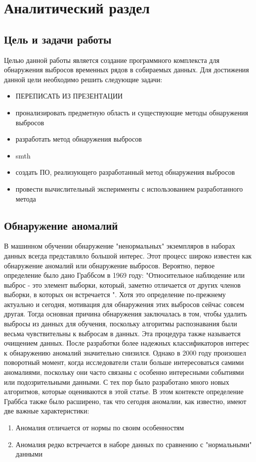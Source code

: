 \chapter{Аналитический раздел}
\label{cha:analysis}
\section{Цель и задачи работы}
Целью данной работы является создание программного комплекста для обнаружения выбросов временных рядов в собираемых данных.
Для достижения данной цели необходимо решить следующие задачи:
\begin{itemize}
	\item ПЕРЕПИСАТЬ ИЗ ПРЕЗЕНТАЦИИ
	\item пронализировать предметную область и существующие методы обнаружения выбросов
	\item разработать метод обнаружения выбросов
	\item smth
	\item создать ПО, реализующего  разработанный метод обнаружения выбросов
	\item провести вычислительный эксперименты с использованием разработанного метода
	
\end{itemize}
\section{Обнаружение аномалий}
В машинном обучении обнаружение  "ненормальных" экземпляров в наборах данных всегда представляло большой интерес. Этот процесс широко известен как обнаружение аномалий или обнаружение выбросов.  Вероятно, первое определение было дано Граббсом\cite{Book02} в 1969 году: "Относительное наблюдение или выброс - это элемент выборки, который, заметно отличается от других членов выборки, в которых он встречается ".
Хотя это определение по-прежнему актуально и сегодня, мотивация для обнаружения этих выбросов сейчас совсем другая. Тогда основная причина обнаружения заключалась в том, чтобы удалить выбросы из данных для обучения, поскольку алгоритмы распознавания  были весьма чувствительны к выбросам в данных. Эта процедура также называется очищением данных. После разработки более надежных классификаторов интерес к обнаружению аномалий значительно снизился. Однако в 2000 году произошел поворотный момент, когда исследователи стали больше интересоваться самими аномалиями, поскольку они часто связаны с особенно интересными событиями или подозрительными данными. С тех пор было разработано много новых алгоритмов, которые оцениваются в этой статье. В этом контексте определение Граббса также было расширено, так что сегодня аномалии, как известно, имеют две важные характеристики:
\begin{enumerate}
	\item Аномалия отличается от нормы по своим особенностям
	\item Аномалия редко встречается в наборе данных по сравнению с "нормальными" данными
\end{enumerate}
